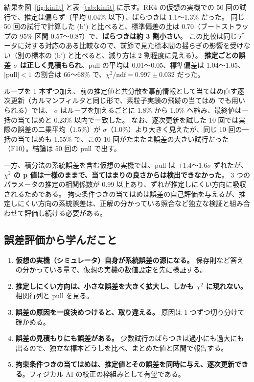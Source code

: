 \documentclass[paper=a4paper,fontsize=10pt,twocolumn,column_gap=2zw,line_length=24zw,number_of_lines=46,head_space=20mm]{jlreq}
\begin{document}
結果を図~\ref{fig:kinfit} と表~\ref{tab:kinfit} に示す。RK4 の仮想の実機での 50 回の試行で、推定は偏らず（平均 0.04\% 以下）、ばらつきは 1.1〜1.3\% だった。
同じ 50 回の試行で計算した (b$'$) と比べると、標準偏差の比は 0.70（ブートストラップの 95\% 区間 0.57〜0.87）で、\textbf{ばらつきは約 3 割小さい}。
この比較は同じデータに対する対応のある比較なので、前節で見た標本間の揺らぎの影響を受けない（別の標本の (b$'$) と比べると、減り方は 2 割程度に見える）。
\textbf{推定ごとの誤差 $\sigma$ は正しく見積もられ}、pull の平均は 0.01〜0.05、標準偏差は 1.04〜1.05、$|\text{pull}|<1$ の割合は 66〜68\% で、$\chi^2/\text{ndf}=0.997\pm0.032$ だった。

ループを 1 本ずつ加え、前の推定値と共分散を事前情報として当てはめ直す逐次更新（カルマンフィルタと同じ形で、素粒子実験の飛跡の当てはめ \cite{fruhwirth1987} でも用いられる）では、
$\sigma$ はループを加えるごとに 1.8\% から 1.0\% へ縮み、最終値は一括の当てはめと 0.23\% 以内で一致した。
なお、逐次更新を試した 10 回では実際の誤差の二乗平均（1.5\%）が $\sigma$（1.0\%）より大きく見えたが、同じ 10 回の一括の当てはめも 1.55\% で、この 10 回がたまたま誤差の大きい試行だった（F10）。結論は 50 回の pull で出す。

一方、積分法の系統誤差を含む仮想の実機では、pull は $+1.4$〜$1.6\sigma$ ずれたが、\textbf{$\chi^2$ の p 値は一様のままで、当てはまりの良さからは検出できなかった}。
3 つのパラメータの推定の相関係数が 0.99 以上あり、ずれが推定しにくい方向に吸収されるためである。
拘束条件つきの当てはめは誤差の自己評価を与えるが、推定しにくい方向の系統誤差は、正解の分かっている照合など独立な検証と組み合わせて評価し続ける必要がある。

\subsection{誤差評価から学んだこと}
\begin{enumerate}\setlength{\itemsep}{0pt}
\item \textbf{仮想の実機（シミュレータ）自身が系統誤差の源になる。} 保存則など答えの分かっている量で、仮想の実機の数値設定を先に検証する。
\item \textbf{推定しにくい方向は、小さな誤差を大きく拡大し、しかも $\chi^2$ に現れない。} 相関行列と pull を見る。
\item \textbf{誤差の原因を一度決めつけると、取り違える。} 原因は 1 つずつ切り分けて確かめる。
\item \textbf{誤差の見積もりにも誤差がある。} 少数試行のばらつきは過小にも過大にも出るので、独立な標本どうしを比べ、まとめた値と区間で報告する。
\item \textbf{拘束条件つきの当てはめは、推定値とその誤差を同時に与え、逐次更新できる}。フィジカル AI の校正の枠組みとして有望である。
\end{enumerate}
\end{document}
